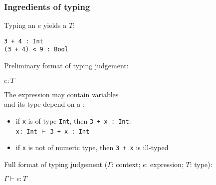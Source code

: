\documentclass{beamer}
\begin{document}
\begin{frame}[fragile]\frametitle{Ingredients of typing}

  Typing an  $e$ yields a  $T$:

  \texttt{3 + 4 : Int}\\
  \texttt{(3 + 4) < 9 : Bool}

  Preliminary format of typing judgement:
  \begin{center}
    $e : T$
  \end{center}

  \pause
  The expression  may contain variables\\
  and its type depend on a :
  \begin{itemize}
  \item if \texttt{x} is of type \texttt{Int}, then \texttt{3 + x : Int}:\\
    \texttt{x: Int} $\vdash$ \texttt{3 + x : Int}
  \item if \texttt{x} is not of numeric type, then \texttt{3 + x} is ill-typed
  \end{itemize}

  \vspace{2mm}
  Full format of typing judgement ($\Gamma$: context; $e$: expression; $T$: type):
  \begin{center}
    $\Gamma \vdash e : T$
  \end{center}
  

\end{frame}
\end{document}
